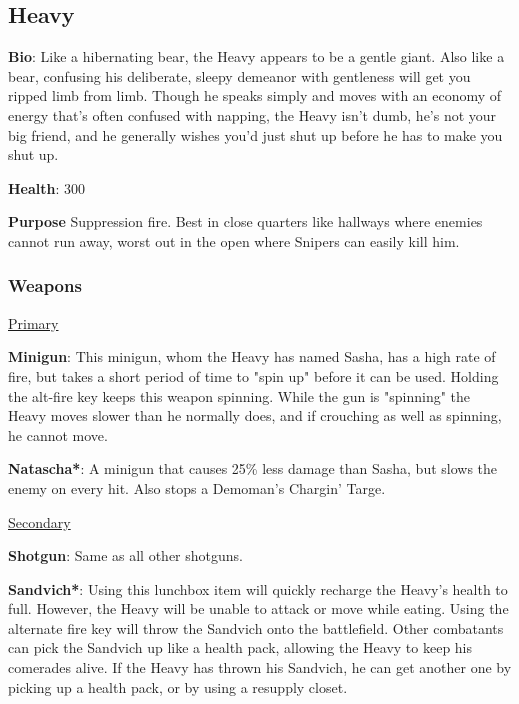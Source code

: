 \subsection{Heavy}
{\bf Bio}:
Like a hibernating bear, the Heavy appears to be a gentle giant. Also like a bear, confusing his deliberate, sleepy demeanor with gentleness will get you ripped limb from limb. Though he speaks simply and moves with an economy of energy that's often confused with napping, the Heavy isn't dumb, he's not your big friend, and he generally wishes you'd just shut up before he has to make you shut up.

{\bf Health}: 300

{\bf Purpose}
Suppression fire. Best in close quarters like hallways where enemies cannot run away, worst out in the open where Snipers can easily kill him.

\subsubsection {Weapons}


\begin {center}
\underline {Primary}
\end {center}

{\bf Minigun}: This minigun, whom the Heavy has named Sasha, has a high rate of fire, but takes a short period of time to "spin up" before it can be used. Holding the alt-fire key keeps this weapon spinning. While the gun is "spinning" the Heavy moves slower than he normally does, and if crouching as well as spinning, he cannot move.

{\bf Natascha*}: A minigun that causes 25\% less damage than Sasha, but slows the enemy on every hit.  Also stops a Demoman's Chargin' Targe.


\begin {center}
\underline {Secondary}
\end {center}

{\bf Shotgun}: Same as all other shotguns.

{\bf Sandvich*}: Using this lunchbox item will quickly recharge the Heavy's health to full.  However, the Heavy will be unable to attack or move while eating. Using the alternate fire key will throw the Sandvich onto the battlefield. Other combatants can pick the Sandvich up like a health pack, allowing the Heavy to keep his comerades alive. If the Heavy has thrown his Sandvich, he can get another one by picking up a health pack, or by using a resupply closet.


